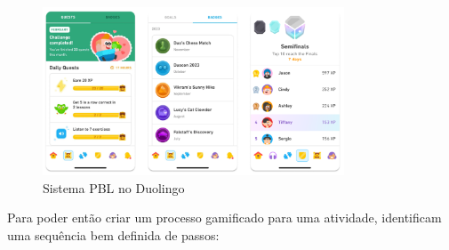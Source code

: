 \documentclass[
	12pt,
	openright,
	twoside,
	a4paper,
	english,
	brazil
	]{abntex2}
\begin{document}
\begin{figure}[H]
  \centering
	\caption{\label{duolingo}Sistema PBL no Duolingo}
  \includegraphics[width=0.8\textwidth]{duolingo}
\end{figure}

Para poder então criar um processo gamificado para uma atividade,  identificam uma sequência bem definida de passos:

\renewcommand{\arraystretch}{1.3}
\end{document}

